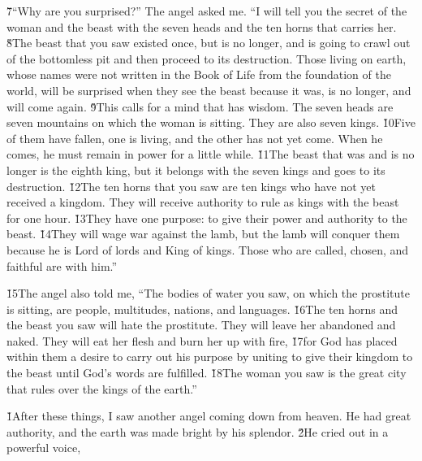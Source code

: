 \v{7}``Why are you surprised?'' The angel asked me. ``I will tell you the secret of the woman and the beast with the seven heads and the ten horns that carries her. \v{8}The beast that you saw existed once, but is no longer, and is going to crawl out of the bottomless pit and then proceed to its destruction. Those living on earth, whose names were not written in the Book of Life from the foundation of the world, will be surprised when they see the beast because it was, is no longer, and will come again. \v{9}This calls for a mind that has wisdom. The seven heads are seven mountains on which the woman is sitting. They are also seven kings. \v{10}Five of them have fallen, one is living, and the other has not yet come. When he comes, he must remain in power for a little while. \v{11}The beast that was and is no longer is the eighth king, but it belongs with the seven kings and goes to its destruction. \v{12}The ten horns that you saw are ten kings who have not yet received a kingdom. They will receive authority to rule as kings with the beast for one hour. \v{13}They have one purpose: to give their power and authority to the beast. \v{14}They will wage war against the lamb, but the lamb will conquer them because he is Lord of lords and King of kings. Those who are called, chosen, and faithful are with him.''

\v{15}The angel also told me, ``The bodies of water you saw, on which the prostitute is sitting, are people, multitudes, nations, and languages. \v{16}The ten horns and the beast you saw will hate the prostitute. They will leave her abandoned and naked. They will eat her flesh and burn her up with fire, \v{17}for God has placed within them a desire to carry out his purpose by uniting to give their kingdom to the beast until God's words are fulfilled. \v{18}The woman you saw is the great city that rules over the kings of the earth.''

\v{1}After these things, I saw another angel coming down from heaven. He had great authority, and the earth was made bright by his splendor. \v{2}He cried out in a powerful voice,

